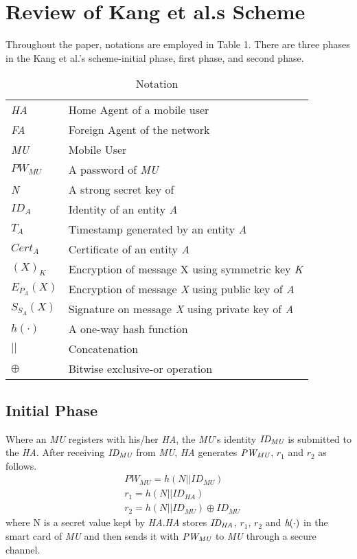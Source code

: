 \documentclass{article}
\begin{document}
\section{Review of Kang et al.s Scheme}
\noindent Throughout the paper, notations are employed in Table 1. There are three phases in the Kang et al.'s scheme-initial phase, first phase, and second phase.\\
\begin{table}[h]
    \renewcommand{\tablename}{Table}
    \caption{Notation}
    \centering
\begin{tabular}{|l|l|}
 \hline
 \emph{HA} & Home Agent of a mobile user \\ \emph{FA} & Foreign Agent of the network \\
 \emph{MU} & Mobile User \\
 \emph{${PW}_{MU}$} & A password of \emph{MU} \\
 \emph{N} & A strong secret key of \\
 \emph{${ID}_A$} & Identity of an entity \emph{A} \\
 $T_A$ & Timestamp generated by an entity \emph{A} \\
 \emph{${Cert}_A$} & Certificate of an entity \emph{A} \\
 \emph{$(X)_K$} & Encryption of message X using symmetric key \emph{K} \\
 \emph{$E_{P_A}(X)$ }& Encryption of message \emph{X} using public key of \emph{A }\\
 \emph{$S_{S_A}(X)$} & Signature on message \emph{X} using private key of \emph{A} \\
 \emph{$h(\cdot)$ }& A one-way hash function \\
 $||$ & Concatenation \\
 $\oplus$ & Bitwise exclusive-or operation \\
 \hline
  \end{tabular}
\end{table}
\subsection{Initial Phase}
Where an \emph{MU} registers with his/her \emph{HA}, the \emph{MU}'s identity $\emph{ID}_{\emph{MU}}$ is submitted to the \emph{HA}. After receiving $\emph{ID}_{\emph{MU}}$ from \emph{MU}, \emph{HA} generates $\emph{PW}_{\emph{MU}}$, $r_1$ and $r_2$ as follows. \\
\begin{align}
    & PW_{MU} = h(N||ID_{MU}) \\
    & r_1 = h(N||ID_{HA}) \\
    & r_2 = h(N||ID_{MU}) \oplus {ID}_{MU}     
\end{align}
where N is a secret value kept by \emph{HA}.\emph{HA} stores $\emph{ID}_{\emph{HA}}$, $r_1$, $r_2$ and $\emph{h}(\cdot)$ in the smart card of \emph{MU} and then sends it with $\emph{PW}_{\emph{MU}}$ to \emph{MU} through a secure channel.
\end{document}
